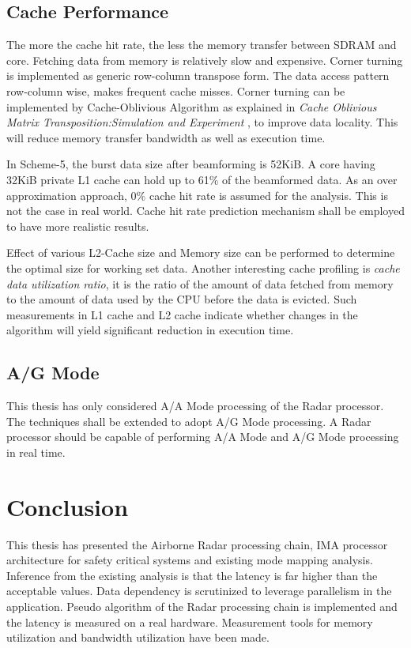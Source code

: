 \subsection{Cache Performance}
The more the cache hit rate, the less the memory transfer between SDRAM and core. Fetching data from memory is relatively slow and expensive. Corner turning is implemented as generic row-column transpose form. The data access pattern row-column wise, makes frequent cache misses. Corner turning can be implemented by Cache-Oblivious Algorithm as explained in \textsl{Cache Oblivious Matrix Transposition:Simulation and Experiment} \cite{cot}, to improve data locality. This will reduce memory transfer bandwidth as well as execution time.  \vspace*{0.2cm}

In Scheme-5, the burst data size after beamforming is 52KiB. A core having 32KiB private L1 cache can hold up to 61\% of the beamformed data. As an over approximation approach, 0\% cache hit rate is assumed for the analysis. This is not the case in real world. Cache hit rate prediction mechanism shall be employed to have more realistic results. \vspace*{0.2cm}

Effect of various L2-Cache size and Memory size can be performed to determine the optimal size for working set data. Another interesting cache profiling is \textsl{cache data utilization ratio}, it is the ratio of the amount of data fetched from memory to the amount of data used by the CPU before the data is evicted. Such measurements in L1 cache and L2 cache indicate whether changes in the algorithm will yield significant reduction in execution time.

\subsection{A/G Mode}
This thesis has only considered A/A Mode processing of the Radar processor. The techniques shall be extended to adopt A/G Mode processing. A Radar processor should be capable of performing A/A Mode and A/G Mode processing in real time.

\section{Conclusion}
\label{sec:ch5:conclustion}
This thesis has presented the Airborne Radar processing chain, IMA processor architecture for safety critical systems and existing mode mapping analysis. Inference from the existing analysis is that the latency is far higher than the acceptable values. Data dependency is scrutinized to leverage parallelism in the application. Pseudo algorithm of the Radar processing chain is implemented and the latency is measured on a real hardware. Measurement tools for memory utilization and bandwidth utilization have been made. \vspace*{0.2cm}

